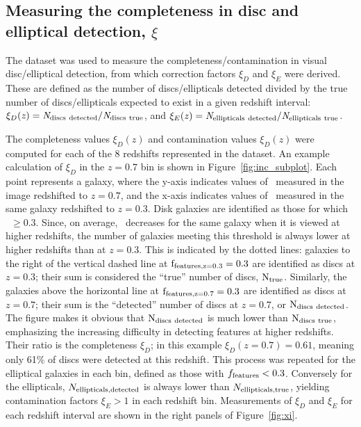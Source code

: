 \documentclass[useAMS,usenatbib]{mn2e}
\begin{document}
\subsection{Measuring the completeness in disc and elliptical detection, $\xi$}
\label{ssec:xi}

The  dataset was used to measure the completeness/contamination in visual disc/elliptical detection, from which correction factors $\xi_D$ and $\xi_E$ were derived. These are defined as the number of discs/ellipticals detected divided by the true number of discs/ellipticals expected to exist in a given redshift interval: $ \xi_D(\it{z})=N_{\rm discs~detected}/N_{\rm discs~true}$, and $\xi_E(\it{z})=N_{\rm ellipticals~detected}/N_{\rm ellipticals~true}$. 

The completeness values $\xi_D(z)$ and contamination values $\xi_D(z)$ were computed for each of the 8 redshifts represented in the  dataset. An example calculation of $\xi_D$ in the $z=0.7$ bin is shown in Figure~\ref{fig:inc_subplot}. Each point represents a  galaxy, where the y-axis indicates values of \ffeatures~measured in the image redshifted to $z=0.7$, and the x-axis indicates values of \ffeatures~measured in the same galaxy redshifted to $z=0.3$. Disk galaxies are identified as those for which \ffeatures~$\ge0.3$. Since, on average, \ffeatures~decreases for the same galaxy when it is viewed at higher redshifts, the number of galaxies meeting this threshold is always lower at higher redshifts than at $z=0.3$. This is indicated by the dotted lines: galaxies to the right of the vertical dashed line at $\rm f_{features,z=0.3}=0.3$ are identified as discs at $z=0.3$; their sum is considered the ``true'' number of discs, $\rm N_{true}$. Similarly, the galaxies above the horizontal line at $\rm f_{features,z=0.7}=0.3$ are identified as discs at $z=0.7$; their sum is the ``detected'' number of discs at $z=0.7$, or $\rm N_{discs~detected}$. The figure makes it obvious that $\rm N_{discs~detected}$ is much lower than $\rm N_{discs~true}$, emphasizing the increasing difficulty in detecting features at higher redshifts. Their ratio is the completeness $\xi_D$; in this example $\xi_D(z=0.7)=0.61$, meaning only 61\% of discs were detected at this redshift. This process was repeated for the elliptical galaxies in each bin, defined as those with $f_{\rm features}<0.3$. Conversely for the ellipticals, $N_{\rm ellipticals, detected}$ is always lower than $N_{\rm ellipticals, true}$, yielding contamination factors $\xi_E>1$ in each redshift bin. Measurements of $\xi_D$ and $\xi_E$ for each redshift interval are shown in the right panels of Figure~\ref{fig:xi}.
\end{document}
